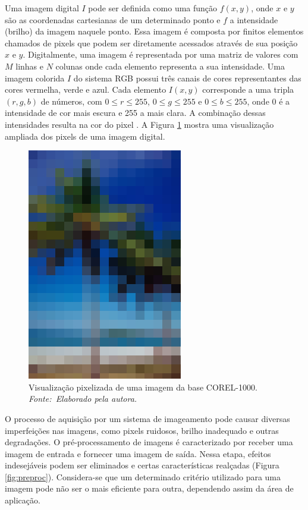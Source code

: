 Uma imagem digital $I$ pode ser definida como uma função $f(x,y)$, onde $x$ e $y$ são as coordenadas cartesianas de um determinado ponto e $f$ a intensidade (brilho) da imagem naquele ponto. Essa imagem é composta por finitos elementos chamados de pixels que podem ser diretamente acessados através de sua posição $x$ e $y$. Digitalmente, uma imagem é representada por uma matriz de valores com $M$ linhas e $N$ colunas onde cada elemento representa a sua intensidade. Uma imagem colorida $I$ do sistema RGB possui três canais de cores representantes das cores vermelha, verde e azul. Cada elemento $I(x,y)$ corresponde a uma tripla $(r, g, b)$ de números, com $0 \leq r \leq 255$, $0 \leq g \leq 255$ e $0 \leq b \leq 255$, onde 0 é a intensidade de cor mais escura e 255 a mais clara. A combinação dessas intensidades resulta na cor do pixel \cite{Gonzalez2007}. A Figura \ref{fig:pixel} mostra uma visualização ampliada dos pixels de uma imagem digital.

\begin{figure}[!htbp]
 \begin{center}
   \includegraphics[width=0.4\linewidth]{figuras/pixel.jpg}
 \caption[Visualização pixelizada de uma imagem da base COREL-1000.]{Visualização pixelizada de uma imagem da base COREL-1000\footnotemark. \\ \textit{Fonte:~Elaborado pela autora.}}
 \label{fig:pixel}
 \end{center}
\end{figure}
O processo de aquisição por um sistema de imageamento pode causar diversas imperfeições nas imagens, como pixels ruidosos, brilho inadequado e outras degradações. O pré-processamento de imagens é caracterizado por receber uma imagem de entrada e fornecer uma imagem de saída. Nessa etapa, efeitos indesejáveis podem ser eliminados e certas características realçadas (Figura \ref{fig:preproc}). Considera-se que um determinado critério utilizado para uma imagem pode não ser o mais eficiente para outra, dependendo assim da área de aplicação.

